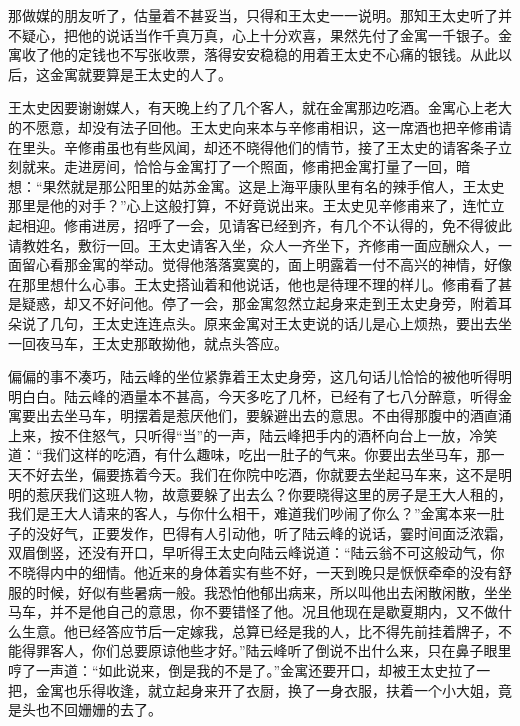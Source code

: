 \documentclass[12pt,UTF8]{ctexbook}
\begin{document}
{{{那做媒的朋友听了，估量着不甚妥当，只得和王太史一一说明。那知王太史听了并不疑心，把他的说话当作千真万真，心上十分欢喜，果然先付了金寓一千银子。金寓收了他的定钱也不写张收票，落得安安稳稳的用着王太史不心痛的银钱。从此以后，这金寓就要算是王太史的人了。

王太史因要谢谢媒人，有天晚上约了几个客人，就在金寓那边吃酒。金寓心上老大的不愿意，却没有法子回他。王太史向来本与辛修甫相识，这一席酒也把辛修甫请在里头。辛修甫虽也有些风闻，却还不晓得他们的情节，接了王太史的请客条子立刻就来。走进房间，恰恰与金寓打了一个照面，修甫把金寓打量了一回，暗想：“果然就是那公阳里的姑苏金寓。这是上海平康队里有名的辣手倌人，王太史那里是他的对手？”心上这般打算，不好竟说出来。王太史见辛修甫来了，连忙立起相迎。修甫进房，招呼了一会，见请客已经到齐，有几个不认得的，免不得彼此请教姓名，敷衍一回。王太史请客入坐，众人一齐坐下，齐修甫一面应酬众人，一面留心看那金寓的举动。觉得他落落寞寞的，面上明露着一付不高兴的神情，好像在那里想什么心事。王太史搭讪着和他说话，他也是待理不理的样儿。修甫看了甚是疑惑，却又不好问他。停了一会，那金寓忽然立起身来走到王太史身旁，附着耳朵说了几句，王太史连连点头。原来金寓对王太吏说的话儿是心上烦热，要出去坐一回夜马车，王太史那敢拗他，就点头答应。

偏偏的事不凑巧，陆云峰的坐位紧靠着王太史身旁，这几句话儿恰恰的被他听得明明白白。陆云峰的酒量本不甚高，今天多吃了几杯，已经有了七八分醉意，听得金寓要出去坐马车，明摆着是惹厌他们，要躲避出去的意思。不由得那腹中的酒直涌上来，按不住怒气，只听得“当”的一声，陆云峰把手内的酒杯向台上一放，冷笑道：“我们这样的吃酒，有什么趣味，吃出一肚子的气来。你要出去坐马车，那一天不好去坐，偏要拣着今天。我们在你院中吃酒，你就要去坐起马车来，这不是明明的惹厌我们这班人物，故意要躲了出去么？你要晓得这里的房子是王大人租的，我们是王大人请来的客人，与你什么相干，难道我们吵闹了你么？”金寓本来一肚子的没好气，正要发作，巴得有人引动他，听了陆云峰的说话，霎时间面泛浓霜，双眉倒竖，还没有开口，早听得王太史向陆云峰说道：“陆云翁不可这般动气，你不晓得内中的细情。他近来的身体着实有些不好，一天到晚只是恹恹牵牵的没有舒服的时候，好似有些暑病一般。我恐怕他郁出病来，所以叫他出去闲散闲散，坐坐马车，并不是他自己的意思，你不要错怪了他。况且他现在是歇夏期内，又不做什么生意。他已经答应节后一定嫁我，总算已经是我的人，比不得先前挂着牌子，不能得罪客人，你们总要原谅他些才好。”陆云峰听了倒说不出什么来，只在鼻子眼里哼了一声道：“如此说来，倒是我的不是了。”金寓还要开口，却被王太史拉了一把，金寓也乐得收逢，就立起身来开了衣厨，换了一身衣服，扶着一个小大姐，竟是头也不回姗姗的去了。

}}}
\end{document}
